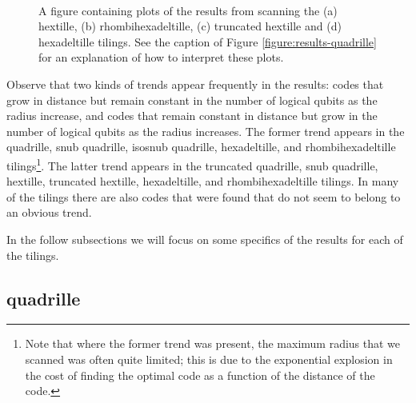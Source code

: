 \documentclass[12pt]{amsbook}
\theoremstyle{plain}
\theoremstyle{definition}
\theoremstyle{remark}
\begin{document}
\begin{figure}
\hspace{1.67in}
 \\
\caption{
\label{figure:results-hextille}
A figure containing plots of the results from scanning the (a) hextille, (b) rhombihexadeltille, (c) truncated hextille and (d) hexadeltille tilings.  See the caption of Figure \ref{figure:results-quadrille} for an explanation of how to interpret these plots.
}
\end{figure}

Observe that two kinds of trends appear frequently in the results:  codes that grow in distance but remain constant in the number of logical qubits as the radius increase, and codes that remain constant in distance but grow in the number of logical qubits as the radius increases.  The former trend appears in the quadrille, snub quadrille, isosnub quadrille, hexadeltille, and rhombihexadeltille tilings\footnote{Note that where the former trend was present, the maximum radius that we scanned was often quite limited;  this is due to the exponential explosion in the cost of finding the optimal code as a function of the distance of the code.}.  The latter trend appears in the truncated quadrille, snub quadrille, hextille, truncated hextille, hexadeltille, and rhombihexadeltille tilings.  In many of the tilings there are also codes that were found that do not seem to belong to an obvious trend.

In the follow subsections we will focus on some specifics of the results for each of the tilings.

\subsection{quadrille}
\end{document}
